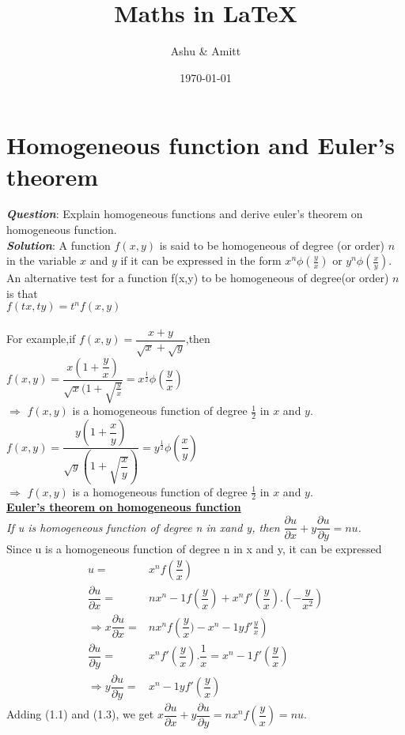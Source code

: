 \documentclass{report}
\title{Maths in \LaTeX}
\author{Ashu \& Amitt}
\date{\today}
\begin{document}
\maketitle
\tableofcontents
	\chapter{Homogeneous function and Euler's theorem}
		\textbf{\textit{Question}}: Explain homogeneous functions and derive euler's theorem on homogeneous function.
	    \\[12pt]
		\noindent \textbf{\textit{Solution}}:
		A function \(f(x,y)\) is said to be homogeneous of degree (or order) $n$ in the variable $x$ and $y$ if it can be  expressed in the form \(x^n\phi(\frac{y}{x})\) or \(y^n\phi(\frac{x}{y})\). \\[8pt]
		An alternative test for a function f(x,y) to be homogeneous of degree(or order) $n$ is that \\
		\hspace*{5em} \(f(tx,ty)=t^nf(x,y)\) \\
		 \\[8pt]
		 For example,if \(f(x,y)=\dfrac{x+y}{\sqrt{x}+\sqrt{y}}\),then
		 \\[8pt]
		\hspace*{5em}  \(f(x,y)=\dfrac{x\left(1+\dfrac{y}{x}\right)}{\sqrt{x}(1+\sqrt{\frac{y}{x}}}=x^\frac{1}{2}\phi\left(\dfrac{y}{x}\right)\)
		\\[8pt]
		$\Rightarrow$ $f(x,y)$ is a homogeneous function of degree $\frac{1}{2}$ in $x$ and $y$. \\[8pt]
		\hspace*{5em} $f(x,y)=\dfrac{y(1+\dfrac{x}{y})}{\sqrt{y}\left(1+\sqrt{\dfrac{x}{y}}\right)}=y^\frac{1}{2}\phi(\dfrac{x}{y})$
		\\[8pt]
		$\Rightarrow$ $f(x,y)$ is a homogeneous function of degree $\frac{1}{2}$ in $x$ and $y$. \\[8pt]
		\textbf{\underline{Euler's theorem on homogeneous function}}\\[8pt]
		{\itshape If u is homogeneous function of degree n in xand y, then \(\dfrac{\partial{u}}{\partial{x}} + y\dfrac{\partial{u}}{\partial{y}}=nu\).}
		\\[8pt]
		Since u is a homogeneous function of degree n in x and y, it can be expressed
		\begin{align}
			u =& x^nf\left(\dfrac{y}{x}\right) \\
			\dfrac{\partial{u}}{\partial{x}}=&nx^n-1f\left(\dfrac{y}{x}\right)+x^n f'\left(\dfrac{y}{x}\right).\left(-\dfrac{y}{x^2}\right) \\
			\Rightarrow x\dfrac{\partial{u}}{\partial{x}}=&nx^nf\left(\dfrac{y}{x})-x^n-1 yf' \frac{y}{x}\right)  \\
			\dfrac{\partial{u}}{\partial{y}}=&x^nf'\left(\dfrac{y}{x}\right).\dfrac{1}{x}=x^n-1 f'\left(\dfrac{y}{x}\right) \\
			\Rightarrow y\dfrac{\partial{u}}{\partial{y}}=&x^n-1yf'\left({\dfrac{y}{x}}\right)
		\end{align}
		Adding (1.1) and (1.3), we get \(x\dfrac{\partial{u}}{\partial{x}} + y\dfrac{\partial{u}}{\partial{y}}=nx^nf\left(\dfrac{y}{x}\right)=nu\).
\end{document}
